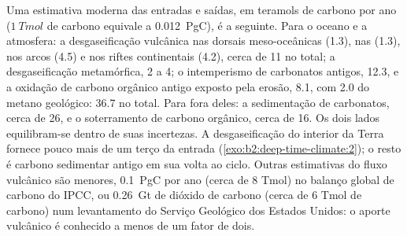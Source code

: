 Uma estimativa moderna das entradas e saídas, em teramols de carbono por ano ($\qty{1}{Tmol}$ de
carbono equivale a \qty{0.012}{PgC}), é a seguinte. Para o oceano e a atmosfera: a desgaseificação vulcânica nas
dorsais meso-oceânicas (1.3), nas  (1.3), nos arcos (4.5) e nos riftes continentais (4.2), cerca de 11 no
total; a desgaseificação metamórfica, 2 a 4; o intemperismo de carbonatos antigos, 12.3, e a oxidação de
carbono orgânico antigo exposto pela erosão, 8.1, com 2.0 do metano geológico: \num{36.7} no total.
Para fora deles: a sedimentação de carbonatos, cerca de 26, e o soterramento de carbono orgânico, cerca de 16. Os dois
lados equilibram-se dentro de suas incertezas. A desgaseificação do interior da Terra fornece pouco mais de um
terço da entrada (\cref{exo:b2:deep-time-climate:2}); o resto é carbono sedimentar antigo em sua
volta ao ciclo. Outras estimativas do fluxo vulcânico são menores, \qty{0.1}{PgC} por ano
(cerca de 8 Tmol) no balanço global de carbono do IPCC, ou \qty{0.26}{Gt} de dióxido de carbono (cerca de 6
Tmol de carbono) num levantamento do Serviço Geológico dos Estados Unidos: o aporte vulcânico é conhecido a menos de um
fator de dois.

